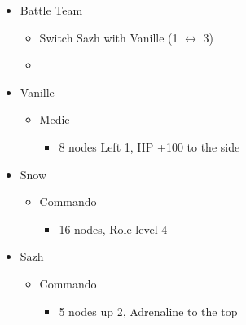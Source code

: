 \begin{multicols}{2}
  \begin{menu}
    \begin{itemize}
      \paradigm
      \begin{itemize}
        \item Battle Team
              \begin{itemize}
                \item Switch Sazh with Vanille (1 $\leftrightarrow$ 3)
                \item {}%
                      {\paradigmline{(\med)}{\com}{(\com)}}%
                      {\paradigmline{(\sab)}{\com}{\com}}%
                      {\paradigmline{(\sab)}{\sen}{(\syn)}}%
                      {\paradigmline{(\rav)}{(\rav)}{(\syn)}}%
                      {\paradigmline[5]{\textit{(\sab)}}{\textit{(\rav)}}{\textit{\rav}}}%
                      {\paradigmline{\rav}{\rav}{\rav}}
              \end{itemize}
      \end{itemize}
      \crystarium
      \begin{itemize}
        \item Vanille
              \begin{itemize}
                \item Medic
                      \begin{itemize}
                        \item 8 nodes Left 1, HP +100 to the side
                      \end{itemize}
              \end{itemize}
        \item Snow
              \begin{itemize}
                \item Commando
                      \begin{itemize}
                        \item 16 nodes, Role level 4
                      \end{itemize}
              \end{itemize}
        \item Sazh
              \begin{itemize}
                \item Commando
                      \begin{itemize}
                        \item 5 nodes up 2, Adrenaline to the top

\end{itemize}
\end{itemize}
\end{itemize}
\end{itemize}
\end{menu}
\end{multicols}
